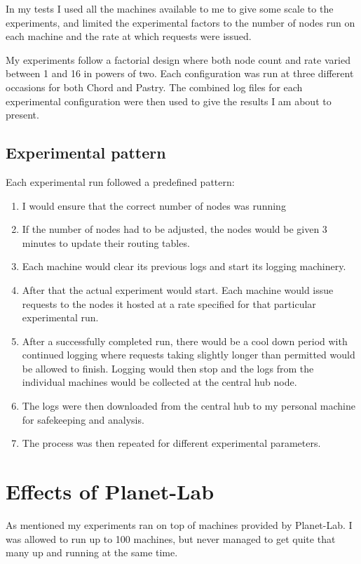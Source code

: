 In my tests I used all the machines available to me to give some scale to the experiments, and limited the experimental factors to the number of nodes run on each machine and the rate at which requests were issued.

My experiments follow a factorial design where both node count and rate varied between 1 and 16 in powers of two. Each configuration was run at three different occasions for both Chord and Pastry. The combined log files for each experimental configuration were then used to give the results I am about to present.

\subsection{Experimental pattern}
Each experimental run followed a predefined pattern:
\begin{enumerate}
\item I would ensure that the correct number of nodes was running
\item If the number of nodes had to be adjusted, the nodes would be given 3 minutes to update their routing tables.
\item Each machine would clear its previous logs and start its logging machinery.
\item After that the actual experiment would start. Each machine would issue requests to the nodes it hosted at a rate specified for that particular experimental run.
\item After a successfully completed run, there would be a cool down period with continued logging where requests taking slightly longer than permitted would be allowed to finish. Logging would then stop and the logs from the individual machines would be collected at the central hub node.
\item The logs were then downloaded from the central hub to my personal machine for safekeeping and analysis.
\item The process was then repeated for different experimental parameters.
\end{enumerate}

\section{Effects of Planet-Lab}
As mentioned my experiments ran on top of machines provided by Planet-Lab. I was allowed to run up to 100 machines, but never managed to get quite that many up and running at the same time.

